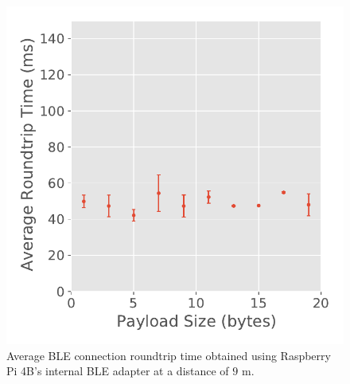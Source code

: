 \begin{figure}[H]
\begin{minipage}{0.45\linewidth}
        \includegraphics[width=\linewidth]{images/ble-roundtrip-hci1-900cm.pdf}
        \caption[Average \acs{BLE} connection roundtrip time obtained using the Raspberry Pi 4B's internal \acs{BLE} adapter at a distance of 9 m.]{Average \acs{BLE} connection roundtrip time obtained using Raspberry Pi 4B's internal \acs{BLE} adapter at a distance of $9\text{ m}$.}
        \label{fig:ble-roundtrip-hci1-9m}
    \end{minipage}
\end{figure}

